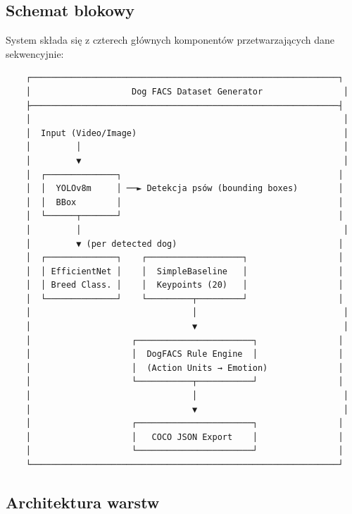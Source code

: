 \documentclass[12pt,a4paper]{article}
\begin{document}
\subsection{Schemat blokowy}

System składa się z czterech głównych komponentów przetwarzających dane sekwencyjnie:

\begin{verbatim}
    ┌─────────────────────────────────────────────────────────────┐
    │                    Dog FACS Dataset Generator                │
    ├─────────────────────────────────────────────────────────────┤
    │                                                              │
    │  Input (Video/Image)                                         │
    │         │                                                    │
    │         ▼                                                    │
    │  ┌──────────────┐                                           │
    │  │  YOLOv8m     │ ──► Detekcja psów (bounding boxes)        │
    │  │  BBox        │                                           │
    │  └──────┬───────┘                                           │
    │         │                                                    │
    │         ▼ (per detected dog)                                │
    │  ┌──────────────┐    ┌───────────────────┐                  │
    │  │ EfficientNet │    │  SimpleBaseline   │                  │
    │  │ Breed Class. │    │  Keypoints (20)   │                  │
    │  └──────────────┘    └─────────┬─────────┘                  │
    │                                │                             │
    │                                ▼                             │
    │                    ┌───────────────────────┐                │
    │                    │  DogFACS Rule Engine  │                │
    │                    │  (Action Units → Emotion)              │
    │                    └───────────┬───────────┘                │
    │                                │                             │
    │                                ▼                             │
    │                    ┌───────────────────────┐                │
    │                    │   COCO JSON Export    │                │
    │                    └───────────────────────┘                │
    └─────────────────────────────────────────────────────────────┘
\end{verbatim}

\subsection{Architektura warstw}
\end{document}
